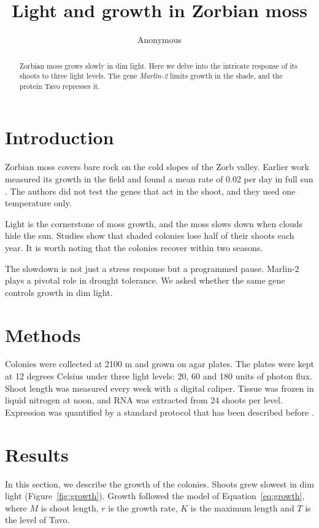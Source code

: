 \documentclass{article}
\title{Light and growth in Zorbian moss}
\author{Anonymous}
\begin{document}
\maketitle

\begin{abstract}
Zorbian moss grows slowly in dim light. Here we delve into the intricate response of its shoots to three light levels. The gene \emph{Marlin-2} limits growth in the shade, and the protein Tavo represses it.
\end{abstract}

\section{Introduction}

Zorbian moss covers bare rock on the cold slopes of the Zorb valley. Earlier work measured its growth in the field and found a mean rate of 0.02 per day in full sun \cite{lorn2019}. The authors did not test the genes that act in the shoot, and they used one temperature only.

Light is the cornerstone of moss growth, and the moss slows down when clouds hide the sun. Studies show that shaded colonies lose half of their shoots each year. It is worth noting that the colonies recover within two seasons.

The slowdown is not just a stress response but a programmed pause. Marlin-2 plays a pivotal role in drought tolerance. We asked whether the same gene controls growth in dim light.

\section{Methods}

Colonies were collected at 2100 m and grown on agar plates. The plates were kept at 12 degrees Celsius under three light levels: 20, 60 and 180 units of photon flux. Shoot length was measured every week with a digital caliper. Tissue was frozen in liquid nitrogen at noon, and RNA was extracted from 24 shoots per level. Expression was quantified by a standard protocol that has been described before \cite{pell2020}.

\section{Results}

In this section, we describe the growth of the colonies. Shoots grew slowest in dim light (Figure~\ref{fig:growth}). Growth followed the model of Equation~\ref{eq:growth}, where $M$ is shoot length, $r$ is the growth rate, $K$ is the maximum length and $T$ is the level of Tavo.
\end{document}
